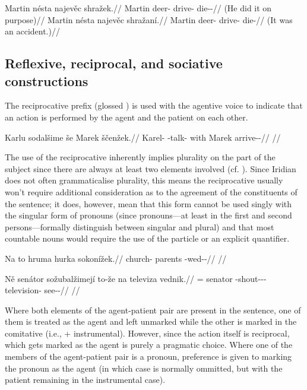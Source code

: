 \pex
\a
\begingl
	\gla Martin nésta najev\v{e}c shražek.//
	\glb Martin deer-\Acc{} drive-\Cv{} die-\Av{}-\Pf{}//
	\glft {} (He did it on purpose)//
\endgl
\a
\begingl
	\gla Martin nésta najev\v{e}c shražaní.//
	\glb Martin deer-\Acc{} drive-\Cv{} die-//
	\glft {} (It was an accident.)//
\endgl
\xe

\subsection{Reflexive, reciprocal, and sociative constructions}

The reciprocative prefix  (glossed \Rec{}) is used with the agentive voice to indicate that an action is performed by the agent and the patient on each other.

\pex
\begingl
\gla Karlu sodalšime še Marek ščenžek.//
\glb Karel-\Ins{} \Rec{}-talk- with Marek arrive-\Av{}-\Pf{}//
\glft {}//
\endgl
\xe

The use of the reciprocative inherently implies plurality on the part of the subject since there are always at least two elements involved (cf. \cite[255]{tesniere1965}). Since Iridian does not often grammaticalise plurality, this means the reciprocative usually won't require additional consideration as to the agreement of the constituents of the sentence; it does, however, mean that this form cannot be used singly with the singular form of pronouns (since pronouns---at least in the first and second persons---formally distinguish between singular and plural) and that most countable nouns would require the use of the particle  or an explicit quantifier.

\pex
\begingl
\gla Na to hruma hurka sokonížek.//
\glb \Loc{} \Dem{} church-\Acc{} parents \Rec{}-wed-\Av{}-\Pf{}//
\glft {}//
\endgl
\xe

\pex
\begingl
\gla N\v{e} senátor sožubalžimej\'i to-\v{z}e na televiza vednik.//
\glb \Pl{}= senator \Rec{}-shout-\Av{}-\Prog{}-\Quot{} \Qp{} \Loc{} television-\Acc{} see-\Pv{}-\Pf{}//
\glft {}//
\endgl
\xe

Where both elements of the agent-patient pair are present in the sentence, one of them is treated as the agent and left unmarked while the other is marked in the comitative (i.e.,  + instrumental). However, since the action itself is reciprocal, which gets marked as the agent is purely a pragmatic choice. Where one of the members of the agent-patient pair is a pronoun, preference is given to marking the pronoun as the agent (in which case  is normally ommitted, but with the patient remaining in the instrumental case).

